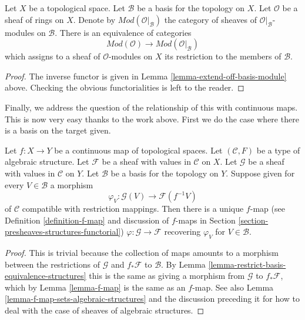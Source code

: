 \begin{lemma}
\label{lemma-restrict-basis-equivalence-modules}
Let $X$ be a topological space.
Let $\mathcal{B}$ be a basis for the topology on $X$.
Let $\mathcal{O}$ be a sheaf of rings on $X$.
Denote by $\textit{Mod}(\mathcal{O}|_\mathcal{B})$ the category of
sheaves of $\mathcal{O}|_\mathcal{B}$-modules on $\mathcal{B}$.
There is an equivalence of categories
$$
\textit{Mod}(\mathcal{O})
\longrightarrow
\textit{Mod}(\mathcal{O}|_\mathcal{B})
$$
which assigns to a sheaf of $\mathcal{O}$-modules on $X$ its restriction to
the members of $\mathcal{B}$.
\end{lemma}

\begin{proof}
The inverse functor is given in
Lemma \ref{lemma-extend-off-basis-module} above.
Checking the obvious functorialities is left to the reader.
\end{proof}

\noindent
Finally, we address the question of the relationship of this with
continuous maps. This is now very easy thanks to the work
above. First we do the case where there is a basis on the
target given.

\begin{lemma}
\label{lemma-f-map-basis-below-structures}
Let $f : X \to Y$ be a continuous map of topological spaces.
Let $(\mathcal{C}, F)$ be a type of algebraic structure.
Let $\mathcal{F}$ be a sheaf with values in $\mathcal{C}$ on $X$.
Let $\mathcal{G}$ be a sheaf with values in $\mathcal{C}$ on $Y$.
Let $\mathcal{B}$ be a basis for the topology on $Y$.
Suppose given for every $V \in \mathcal{B}$ a morphism
$$
\varphi_V :
\mathcal{G}(V)
\longrightarrow
\mathcal{F}(f^{-1}V)
$$
of $\mathcal{C}$ compatible with restriction mappings.
Then there is a unique $f$-map (see Definition \ref{definition-f-map}
and discussion of $f$-maps in
Section \ref{section-presheaves-structures-functorial})
$\varphi : \mathcal{G} \to \mathcal{F}$
recovering $\varphi_V$ for $V \in \mathcal{B}$.
\end{lemma}

\begin{proof}
This is trivial because the collection of maps
amounts to a morphism between the restrictions
of $\mathcal{G}$ and $f_*\mathcal{F}$ to $\mathcal{B}$.
By Lemma \ref{lemma-restrict-basis-equivalence-structures}
this is the same as giving a morphism from $\mathcal{G}$
to $f_*\mathcal{F}$, which by Lemma \ref{lemma-f-map}
is the same as an $f$-map. See also
Lemma \ref{lemma-f-map-sets-algebraic-structures}
and the discussion preceding it
for how to deal with the case of sheaves of algebraic structures.
\end{proof}

